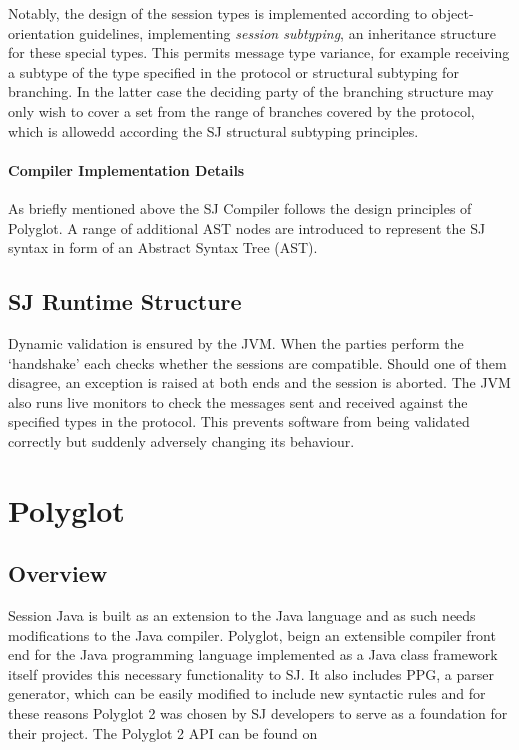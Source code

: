 Notably, the design of the session types is implemented according to object-orientation guidelines, implementing \textit{session subtyping}, an inheritance structure for these special types. This permits message type variance, for example receiving a subtype of the type specified in the protocol or structural subtyping for branching. In the latter case the deciding party of the branching structure may only wish to cover a set from the range of branches covered by the protocol, which is allowedd according the SJ structural subtyping principles.

\paragraph*{Compiler Implementation Details}
As briefly mentioned above the SJ Compiler follows the design principles of Polyglot. A range of additional AST nodes are introduced to represent the SJ syntax in form of an Abstract Syntax Tree (AST). 




\subsection{SJ Runtime Structure}
\label{subsec:sjrun}

Dynamic validation is ensured by the JVM. When the parties perform the `handshake' each checks whether the sessions are compatible. Should one of them disagree, an exception is raised at both ends and the session is aborted. The JVM also runs live monitors to check the messages sent and received against the specified types in the protocol. This prevents software from being validated correctly but suddenly adversely changing its behaviour.



\section{Polyglot}
\label{sec:polyglot}

\subsection{Overview}
\label{subsec:polyglotoverview}
Session Java is built as an extension to the Java language and as such needs modifications to the Java compiler. Polyglot, beign an extensible compiler front end for the Java programming language implemented as a Java class framework \cite{polyglotonline} itself provides this necessary functionality to SJ. It also includes PPG, a parser generator, which can be easily modified to include new syntactic rules and for these reasons Polyglot 2 was chosen by SJ developers to serve as a foundation for their project. The Polyglot 2 API can be found on \cite{polyglotapi}

